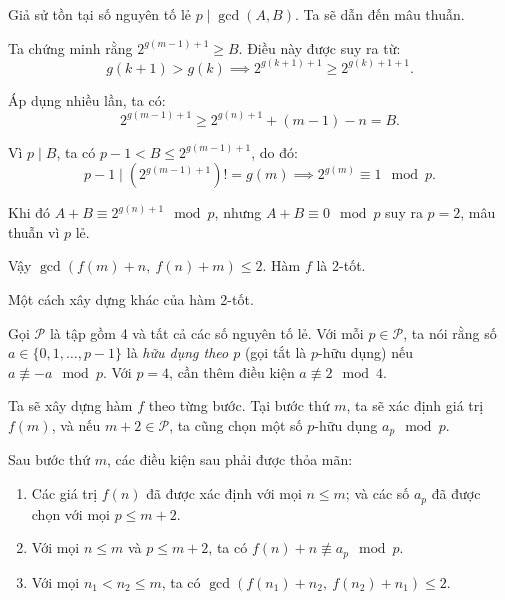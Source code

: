 \begin{problem}
\begin{soln}
    Giả sử tồn tại số nguyên tố lẻ \( p \mid \gcd(A,B) \). Ta sẽ dẫn đến mâu thuẫn.

    Ta chứng minh rằng \( 2^{g(m-1)+1} \ge B \). Điều này được suy ra từ:
    \[
        g(k+1) > g(k) \implies 2^{g(k+1)+1} \ge 2^{g(k)+1+1}.
    \]

    Áp dụng nhiều lần, ta có:
    \[
        2^{g(m-1)+1} \ge 2^{g(n)+1} + (m - 1) - n = B.
    \]

    Vì \( p \mid B \), ta có \( p - 1 < B \le 2^{g(m-1)+1} \), do đó:
    \[
        p - 1 \mid (2^{g(m-1)+1})! = g(m) \implies 2^{g(m)} \equiv 1 \mod p.
    \]

    Khi đó \( A + B \equiv 2^{g(n)+1} \mod p \), nhưng \( A + B \equiv 0 \mod p \) suy ra \( p = 2 \), mâu thuẫn vì \( p \) lẻ.

    Vậy \( \gcd(f(m) + n,\ f(n) + m) \le 2 \). Hàm \( f \) là 2-tốt.
\end{soln}

\begin{soln}
    Một cách xây dựng khác của hàm 2-tốt.

    Gọi \( \mathcal{P} \) là tập gồm 4 và tất cả các số nguyên tố lẻ.
    Với mỗi \( p \in \mathcal{P} \), ta nói rằng số \( a \in \{0, 1, \ldots, p - 1\} \) là \textit{hữu dụng theo \( p \)}
    (gọi tắt là \( p \)-hữu dụng) nếu \( a \not\equiv -a \mod p \). Với \( p = 4 \), cần thêm điều kiện \( a \not\equiv 2 \mod 4 \).

    Ta sẽ xây dựng hàm \( f \) theo từng bước. Tại bước thứ \( m \), ta sẽ xác định giá trị \( f(m) \),
    và nếu \( m + 2 \in \mathcal{P} \), ta cũng chọn một số \( p \)-hữu dụng \( a_p \mod p \).

    Sau bước thứ \( m \), các điều kiện sau phải được thỏa mãn:

    \begin{enumerate}[topsep=0pt, partopsep=0pt, itemsep=0pt, label=(\roman*)]
        \item Các giá trị \( f(n) \) đã được xác định với mọi \( n \le m \); và các số \( a_p \) đã được chọn với mọi \( p \le m + 2 \).
        \item Với mọi \( n \le m \) và \( p \le m + 2 \), ta có \( f(n) + n \not\equiv a_p \mod p \).
        \item Với mọi \( n_1 < n_2 \le m \), ta có \( \gcd(f(n_1) + n_2,\ f(n_2) + n_1) \le 2 \).
    \end{enumerate}


\end{soln}
\end{problem}
